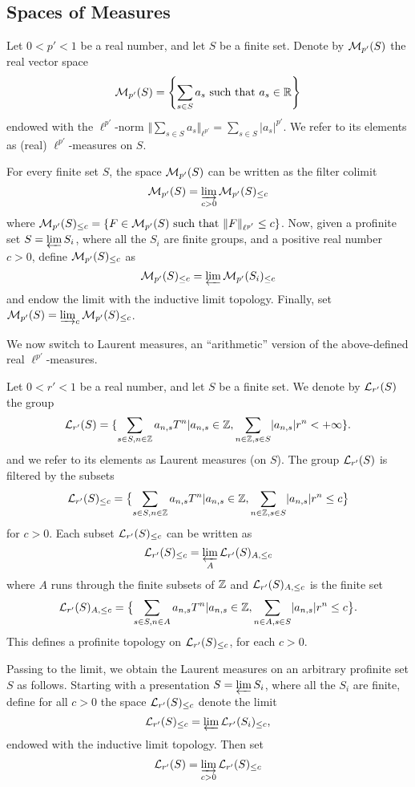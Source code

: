 \subsection{Spaces of Measures}

\begin{definition}
  \label{real-measures}
  \leanok
  Let $0 < p' < 1$ be a real number, and let $S$ be a finite set.
  Denote by $\mathcal M_{p'}(S)$ the real vector space
\[
\mathcal M_{p'}(S)=\left\{\sum_{s\in S}a_{s} \text{ such that } a_{s}\in \mathbb{R}\right\}
\]
endowed with the $\ell^{p'}$-norm $\Vert \sum_{s\in S}a_s\Vert_{\ell^{p'}}=\sum_{s\in S}\lvert a_s\rvert ^{p'}$. We refer to its elements as (real) $\ell^{p'}$-measures on $S$.
\end{definition}
For every finite set $S$, the space $\mathcal M_{p'}(S)$ can be written as the filter colimit
\[
\mathcal M_{p'}(S)=\varinjlim_{c>0}\mathcal M_{p'}(S)_{\leq c}
\]
where $\mathcal M_{p'}(S)_{\leq c}=\left\{F \in \mathcal M_{p'}(S) \text{ such that } \Vert F \Vert_{\ell^{p'}}\leq c\right\}$. Now, given a profinite set $S=\varprojlim S_i$, where all the $S_i$ are finite groups, and a positive real number $c>0$, define $\mathcal M_{p'}(S)_{\leq c}$ as
\[
\mathcal M_{p'}(S)_{\leq c}=\varprojlim \mathcal M_{p'}(S_i)_{\leq c}
\]
and endow the limit with the inductive limit topology. Finally, set $\mathcal M_{p'}(S)=\varinjlim_{c}\mathcal M_{p'}(S)_{\leq c}$.

We now switch to Laurent measures, an ``arithmetic'' version of the above-defined real $\ell^{p'}$-measures.

\begin{definition}
  \label{laurent-measures-fin}
  \leanok
  Let $0 < r' < 1$ be a real number, and let $S$ be a finite set. We denote by $\mathcal L_{r'}(S)$ the group
\[
\mathcal L_{r'}(S)=\{\sum_{s\in S,n\in \mathbb{Z}}a_{n,s}T^n \vert a_{n,s}\in \mathbb{Z}, \sum_{n\in\mathbb{Z}, s\in S}\lvert a_{n,s}\rvert r^n
< + \infty\}.
\]
and we refer to its elements as Laurent measures (on $S$).
The group $\mathcal L_{r'}(S)$ is filtered by the subsets
\[
\mathcal L_{r'}(S)_{\leq c}=\bigl\{\sum_{s\in S,n\in \mathbb{Z}}a_{n,s}T^n \vert a_{n,s}\in \mathbb{Z}, \sum_{n\in\mathbb{Z}, s\in S}\lvert a_{n,s}\rvert r^n
\leq c\bigr\}
\]
for $c> 0$. Each subset $\mathcal L_{r'}(S)_{\leq c}$ can be written as
\[
\mathcal L_{r'}(S)_{\leq c}=\varprojlim_{A}\mathcal L_{r'}(S)_{A,\leq c}
\]
where $A$ runs through the finite subsets of $\mathbb{Z}$ and $\mathcal L_{r'}(S)_{A,\leq c}$ is the finite set
\[
\mathcal L_{r'}(S)_{A,\leq c}=\bigl\{\sum_{s\in S,n\in A}a_{n,s}T^n \vert a_{n,s}\in \mathbb{Z}, \sum_{n\in A, s\in S}\lvert a_{n,s}\rvert r^n\leq c\bigr\}.
\]
This defines a profinite topology on $\mathcal L_{r'}(S)_{\leq c}$, for each $c>0$.
\end{definition}
Passing to the limit, we obtain the Laurent measures on an arbitrary profinite set $S$ as follows. 
Starting with a presentation $S=\varprojlim S_i$, where all the $S_i$ are finite, define for all $c>0$ the space $\mathcal L_{r'}(S)_{\leq c}$ denote the limit
\[
\mathcal L_{r'}(S)_{\leq c}=\varprojlim\mathcal L_{r'}(S_i)_{\leq c},
\]
endowed with the inductive limit topology. Then set
\[
\mathcal L_{r'}(S)=\varinjlim_{c > 0}\mathcal L_{r'}(S)_{\leq c}
\]

